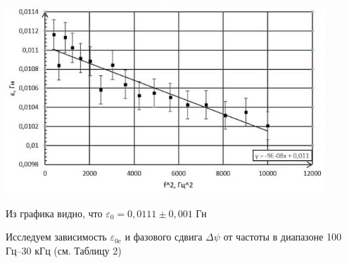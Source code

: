 \documentclass[a4paper,12pt]{report}
\begin{document}
\begin{center}
	\includegraphics[width=0.9\textwidth]{малые частоты.jpg}
\end{center}

Из графика видно, что \( \varepsilon_0 = 0,0111 \pm 0,001\) Гн

Исследуем зависимость $\varepsilon_{0c}$ и фазового сдвига $\Delta \psi$ от частоты в диапазоне 100 Гц–30 кГц (см. Таблицу 2)
\end{document}
